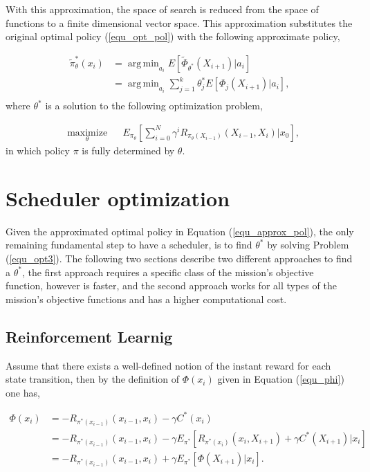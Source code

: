 \documentclass[12pt,aas_macros]{article}
\theoremstyle{definition}
\DeclareMathOperator*{\argmin}{arg\,min}
\begin{document}
With this approximation, the space of search is reduced from the space of functions to a finite dimensional vector space. This approximation substitutes the original optimal policy (\ref{equ_opt_pol}) with the following approximate policy,

\begin{equation}\label{equ_approx_pol}
\begin{aligned}
\tilde{\pi}_{\theta}^*(x_{i})& = \argmin_{a_{i}} E[ \tilde{\Phi}_{\theta^*}(X_{i+1}) | a_{i}]\\
& =  \argmin_{a_{i}} \sum_{j=1}^k \theta^*_j E[\Phi_j(X_{i+1}) | a_{i}],\\
\end{aligned}
\end{equation}
where $\theta^*$ is a solution to the following optimization problem,

\begin{equation}\label{equ_opt3}
\begin{aligned}
& \underset{\theta}{\text{maximize}}
& & E_{\pi_{\theta}}[\sum_{i=0}^N \gamma^i R_{\pi_{\theta} (X_{i-1})}(X_{{i-1}}, X_{i}) | x_0],
\end{aligned}
\end{equation}
in which policy $\pi$ is fully determined by $\theta$.
 
 
\section{Scheduler optimization}\label{sec_opt}

Given the approximated optimal policy in Equation (\ref{equ_approx_pol}), the only remaining fundamental step to have a scheduler, is to find $\theta^*$ by solving Problem (\ref{equ_opt3}). The following two sections describe two different approaches to find a $\theta^*$, the first approach requires a specific class of the mission's objective function, however is faster, and the second approach works for all types of the mission's objective functions and has a higher computational cost. 

\subsection{Reinforcement Learnig}

Assume that there exists a well-defined notion of the instant reward for each state transition, then by the definition of $\Phi(x_{{i}})$ given in Equation (\ref{equ_phi}) one has,

\begin{equation}
\begin{aligned}
\Phi(x_{i}) &= - R_{\pi^*(x_{i-1})}(x_{i-1},x_i) - \gamma C^*({x_{i}})\\
&= - R_{\pi^*(x_{i-1})}(x_{i-1},x_i) - \gamma E_{\pi^*}[R_{\pi^*(x_{i})}(x_{i},X_{i+1})  +\gamma C^*({X_{{i+1}}})|x_i]\\
&= - R_{\pi^*(x_{i-1})}(x_{i-1},x_i)  + \gamma E_{\pi^*}[\Phi(X_{{i+1}})|x_i].\\
\end{aligned}
\end{equation}
\end{document}
